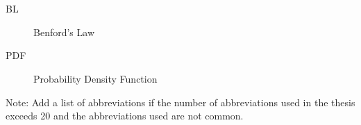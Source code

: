 \chapter*{\SeznamZkratek}

\begin{multicols}{2}
\raggedright
\begin{description}
\item [BL] Benford's Law
\item [PDF] Probability Density Function

\end{description}
\end{multicols}

Note: Add a list of abbreviations if the number of abbreviations used in the thesis exceeds 20 and the abbreviations used are not common.